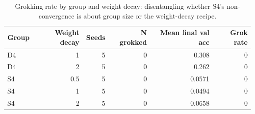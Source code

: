 \begin{table}
\caption{Grokking rate by group and weight decay: disentangling whether S4's non-convergence is about group size or the weight-decay recipe.}
\label{tab:nonabeliangrid}
\begin{tabular}{lrrrrr}
\toprule
Group & Weight decay & Seeds & N grokked & Mean final val acc & Grok rate \\
\midrule
D4 & 1 & 5 & 0 & 0.308 & 0 \\
D4 & 2 & 5 & 0 & 0.262 & 0 \\
S4 & 0.5 & 5 & 0 & 0.0571 & 0 \\
S4 & 1 & 5 & 0 & 0.0494 & 0 \\
S4 & 2 & 5 & 0 & 0.0658 & 0 \\
\bottomrule
\end{tabular}
\end{table}
